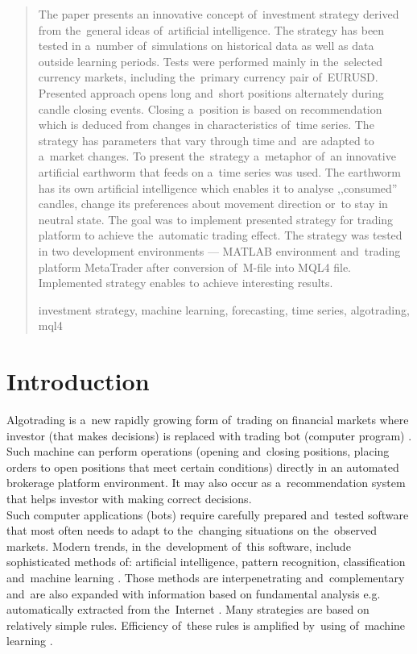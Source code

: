 \documentclass[runningheads,a4paper]{llncs}
\newcommand{\keywords}[1]{\par\addvspace\baselineskip
\noindent\keywordname\enspace\ignorespaces#1}
\begin{document}
\begin{abstract}
The paper presents an innovative concept of~investment strategy derived from the~general ideas of~artificial intelligence. The strategy has been tested in a~number of~simulations on historical data as well as data outside learning periods. Tests were performed mainly in the~selected currency markets, including the~primary currency pair of~\mbox{EURUSD}. Presented approach opens long and~short positions alternately during candle closing events. Closing a~position is based on recommendation which is deduced from changes in characteristics of~time series. The strategy has parameters that vary through time and~are adapted to a~market changes. To present the~strategy a~metaphor of~an innovative artificial earthworm that feeds on a~time series was used. The earthworm has its own artificial intelligence which enables it to analyse ,,consumed'' candles, change its preferences about movement direction or~to stay in neutral state. The goal was to implement presented strategy for trading platform to achieve the~automatic trading effect.  The strategy was tested in two development environments --- MATLAB environment and~trading platform MetaTrader after conversion of~M-file into MQL4 file. Implemented strategy enables to achieve interesting results.
\keywords{investment strategy, machine learning, forecasting, time series, algotrading, mql4}
\end{abstract}


\section{Introduction}

Algotrading is a~new rapidly growing form of~trading on financial markets where investor (that makes decisions) is replaced with trading bot (computer program) \cite{Leshik2011,Wilinski2014}. Such machine can perform operations (opening and~closing positions, placing orders to open positions that meet certain conditions) directly in an automated brokerage platform environment. It may also occur as a~recommendation system that helps investor with making correct decisions.\\

Such computer applications (bots) require carefully prepared and~tested software that most often needs to adapt to the~changing situations on the~observed markets. Modern trends, in the~development of~this software, include sophisticated methods of: artificial intelligence, pattern recognition, classification and~machine learning \cite{Leshik2011,Wilinski,wang,sinclare}. Those methods are interpenetrating and~complementary and~are also expanded with information based on fundamental analysis e.g. automatically extracted from the~Internet \cite{elder,Wilinski2014,Schwager1996}. Many strategies are based on relatively simple rules. Efficiency of~these rules is amplified by~using of~machine learning \cite{Wilinski,person,tian,krutsinger,lewis,murphy}.\\
\end{document}
